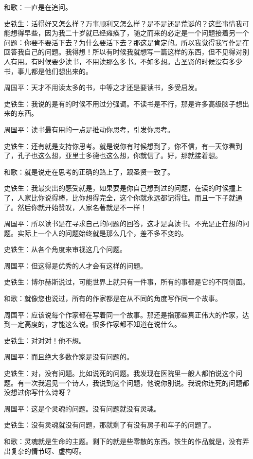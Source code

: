 \documentclass[12pt,a5paper]{ctexbook}
\begin{document}
和歌：一直是在追问。

史铁生：活得好又怎么样？万事顺利又怎么样？是不是还是荒诞的？这些事情我可能想得早些，因为我二十岁就已经瘫痪了，随之而来的必定是一个问题接着另一个问题：你要不要活下去？为什么要活下去？那这是肯定的。所以我觉得我写作是在回答我自己的问题。我得想！所以有时候我就想写一篇这样的东西，但不见得对别人有用。有时候要少读书，不用读那么多书。不如多想。古圣贤的时候没有多少书，事儿都是他们想出来的。

周国平：天才不用读太多的书，中等之才还是要读书，多受启发。

史铁生：我说的是有的时候不用过分强调。不读书是不行，那是许多高级脑子想出来的东西。

周国平：读书最有用的一点是推动你思考，引发你思考。

史铁生：还有就是支持你思考。就是说你有时候想到了，你不信，有一天你看到了，孔子也这么想，亚里士多德也这么想，你就信了。好，那就接着想。

和歌：就是说走在思考的正确的路上了，跟圣贤一致了。

史铁生：我最突出的感受就是，如果要是你自己想到过的问题，在读的时候撞上了，人家比你说得棒，比你想得完全，这个你就永远都记得住。而且一下子就通了。然后你就开始赞叹，人家名著就是不一样！

周国平：所以读书是在寻求自己的问题的回答，这才是真读书。不光是正在想的问题。实际上一个人的问题始终就是那么几个，差不多不变的。

史铁生：从各个角度来审视这几个问题。

周国平：但这得是优秀的人才会有这样的问题。

史铁生：博尔赫斯说过，可能世界上就只有一件事，所有的事都是它的不同侧面。

和歌：就像您也说过，所有的作家都是在从不同的角度写作同一个故事。

周国平：应该说每个作家都在写着同一个故事。那还是指那些真正伟大的作家，达到一定高度的，才能这么说。很多作家都不知道在说什么。

史铁生：对对对！他不想。

周国平：而且绝大多数作家是没有问题的。

史铁生：对，没有问题。比如说死的问题。我发现在医院里一般人都怕说这个问题。有一次我遇见一个诗人，我说到这个问题，他说你别说。我说你连死的问题都没想过你写什么诗呀？

周国平：这是个灵魂的问题。没有问题就没有灵魂。

史铁生：没有灵魂就没有问题，那就剩了有没有房子和车子的问题了。

和歌：灵魂就是生命的主题。剩下的就是些零散的东西。铁生的作品就是，没有弄出复杂的情节呀、虚构呀。
\end{document}
